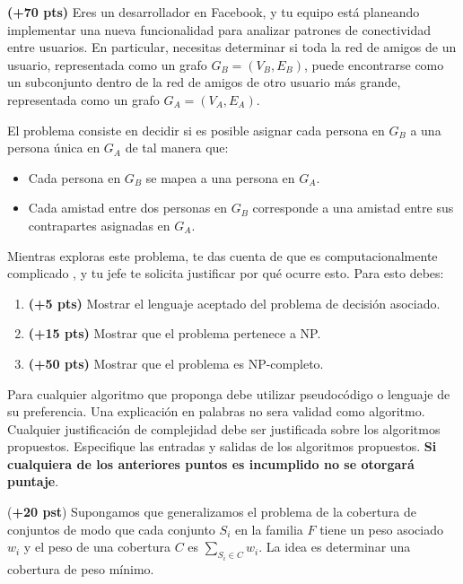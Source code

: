\documentclass[12pt, a4paper]{exam}
\begin{document}
\begin{questions}
    \pointsdroppedatright

    \question \textbf{(+70 pts)} 
    Eres un desarrollador en Facebook, y tu equipo está planeando implementar una nueva 
    funcionalidad para analizar patrones de conectividad entre usuarios. En particular,
    necesitas determinar si toda la red de amigos de un usuario, representada como un 
    grafo \( G_B = (V_B, E_B) \), puede encontrarse como un subconjunto dentro de la red 
    de amigos de otro usuario más grande, representada como un 
    grafo \( G_A = (V_A, E_A) \).

    El problema consiste en decidir si es posible asignar cada persona en \( G_B \) a una
    persona única en \( G_A \) de tal manera que:  
    \begin{itemize}
        \item Cada persona en \( G_B \) se mapea a una persona en \( G_A \).  
        \item Cada amistad entre dos personas en \( G_B \) corresponde a una amistad entre
        sus contrapartes asignadas en \( G_A \).
    \end{itemize}

    Mientras exploras este problema, te das cuenta de que es computacionalmente complicado
    , y tu jefe te solicita justificar por qué ocurre esto. Para esto debes:

    \begin{enumerate}
        \item \textbf{(+5 pts)}  Mostrar el lenguaje aceptado del problema de decisión asociado.
        \item \textbf{(+15 pts)} Mostrar que el problema pertenece a NP.  
        \item \textbf{(+50 pts)} Mostrar que el problema es NP-completo. 
    \end{enumerate}

    Para cualquier algoritmo que proponga debe utilizar pseudocódigo o lenguaje de su 
    preferencia. Una explicación en palabras no sera validad como algoritmo. Cualquier 
    justificación de complejidad debe ser justificada sobre los algoritmos propuestos.
    Especifique las entradas y salidas de los algoritmos propuestos. \textbf{Si cualquiera 
    de los anteriores puntos es incumplido no se otorgará puntaje}.

	\question (\textbf{+20 pst}) Supongamos que generalizamos el problema de la cobertura de
    conjuntos de modo que cada conjunto \(S_i\) en la familia \(F\) tiene un peso asociado \(w_i\) y 
	el peso de una cobertura \(C\) es \(\sum_{S_i \in C} w_i\). La idea es determinar una 
	cobertura de peso mínimo. 


\end{questions}
\end{document}
